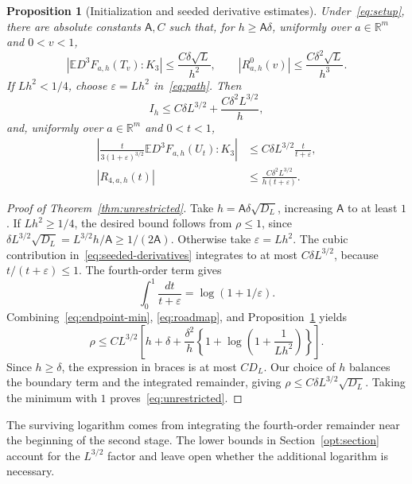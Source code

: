\documentclass[11pt,letterpaper]{article}
\newtheorem{proposition}{Proposition}
\theoremstyle{remark}
\newcommand{\E}{\mathbb E}
\newcommand{\R}{\mathbb R}
\begin{document}
\begin{proposition}[Initialization and seeded derivative estimates]
\label{an:prop:derivative}
Under~\eqref{eq:setup}, there are absolute constants \(\mathsf A,C\)
such that, for \(h\ge\mathsf A\delta\), uniformly over
\(a\in\R^m\) and \(0<v<1\),
\begin{equation}
 |\E D^3F_{a,h}(T_v):K_3|\le\frac{C\delta\sqrt L}{h^2},
 \qquad |R^0_{a,h}(v)|\le\frac{C\delta^2\sqrt L}{h^3}.
 \label{eq:direct-initialization}
\end{equation}
If \(Lh^2<1/4\), choose \(\varepsilon=Lh^2\) in~\eqref{eq:path}.
Then
\begin{equation}
 I_h\le C\delta L^{3/2}+\frac{C\delta^2L^{3/2}}h,
 \label{eq:initialization-bound}
\end{equation}
and, uniformly over \(a\in\R^m\) and \(0<t<1\),
\begin{equation}
 \begin{aligned}
 \left|\frac{t}{3(1+\varepsilon)^{3/2}}
          \E D^3F_{a,h}(U_t):K_3\right|
 &\le C\delta L^{3/2}\frac{t}{t+\varepsilon},\\
 |R_{4,a,h}(t)|&\le\frac{C\delta^2L^{3/2}}{h(t+\varepsilon)}.
 \end{aligned}
 \label{eq:seeded-derivatives}
\end{equation}

\end{proposition}
\begin{proof}[Proof of Theorem~\ref{thm:unrestricted}]
Take \(h=\mathsf A\delta\sqrt{D_L}\), increasing \(\mathsf A\) to at
least \(1\). If \(Lh^2\ge1/4\), the desired bound follows from
\(\rho\le1\), since \(\delta L^{3/2}\sqrt{D_L}=L^{3/2}h/\mathsf A
\ge 1/(2\mathsf A)\). Otherwise take \(\varepsilon=Lh^2\).
The cubic contribution in~\eqref{eq:seeded-derivatives} integrates
to at most \(C\delta L^{3/2}\), because \(t/(t+\varepsilon)\le1\).
The fourth-order term gives
\[
 \int_0^1\frac{dt}{t+\varepsilon}=\log(1+1/\varepsilon).
\]
Combining~\eqref{eq:endpoint-min}, \eqref{eq:roadmap}, and
Proposition~\ref{an:prop:derivative} yields
\[
 \rho\le C L^{3/2}\left[
 h+\delta+\frac{\delta^2}{h}
       \left\{1+\log\!\left(1+\frac1{Lh^2}\right)\right\}\right].
\]
Since \(h\ge\delta\), the expression in braces is at most \(C D_L\).
Our choice of \(h\) balances the boundary term and the integrated
remainder, giving \(\rho\le C\delta L^{3/2}\sqrt{D_L}\). Taking the
minimum with \(1\) proves~\eqref{eq:unrestricted}.
\end{proof}

The surviving logarithm comes from integrating the fourth-order
remainder near the beginning of the second stage. The lower bounds in
Section~\ref{opt:section} account for the \(L^{3/2}\) factor and leave
open whether the additional logarithm is necessary.
\end{document}
